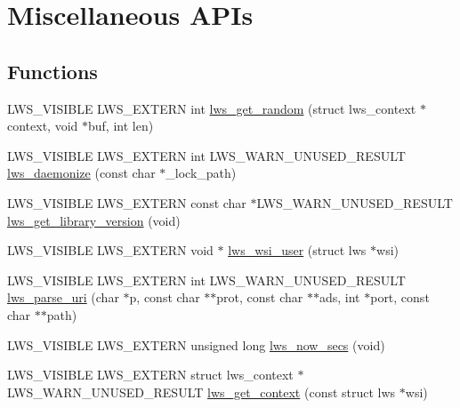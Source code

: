 \hypertarget{group__misc}{}\section{Miscellaneous A\+P\+Is}
\label{group__misc}
\subsection*{Functions}
\begin{DoxyCompactItemize}
\item 
L\+W\+S\+\_\+\+V\+I\+S\+I\+B\+LE L\+W\+S\+\_\+\+E\+X\+T\+E\+RN int \hyperlink{group__misc_ga58f906c6be0ca80efd813f694569dd4a}{lws\+\_\+get\+\_\+random} (struct lws\+\_\+context $\ast$context, void $\ast$buf, int len)
\item 
L\+W\+S\+\_\+\+V\+I\+S\+I\+B\+LE L\+W\+S\+\_\+\+E\+X\+T\+E\+RN int L\+W\+S\+\_\+\+W\+A\+R\+N\+\_\+\+U\+N\+U\+S\+E\+D\+\_\+\+R\+E\+S\+U\+LT \hyperlink{group__misc_gace5171b1dbbc03ec89a98f8afdb5c9af}{lws\+\_\+daemonize} (const char $\ast$\+\_\+lock\+\_\+path)
\item 
L\+W\+S\+\_\+\+V\+I\+S\+I\+B\+LE L\+W\+S\+\_\+\+E\+X\+T\+E\+RN const char $\ast$L\+W\+S\+\_\+\+W\+A\+R\+N\+\_\+\+U\+N\+U\+S\+E\+D\+\_\+\+R\+E\+S\+U\+LT \hyperlink{group__misc_gac6abfc0b2bd5b2f09281a4432bb2f5f0}{lws\+\_\+get\+\_\+library\+\_\+version} (void)
\item 
L\+W\+S\+\_\+\+V\+I\+S\+I\+B\+LE L\+W\+S\+\_\+\+E\+X\+T\+E\+RN void $\ast$ \hyperlink{group__misc_gaa194584fff9698f3b280658f770ccd0f}{lws\+\_\+wsi\+\_\+user} (struct lws $\ast$wsi)
\item 
L\+W\+S\+\_\+\+V\+I\+S\+I\+B\+LE L\+W\+S\+\_\+\+E\+X\+T\+E\+RN int L\+W\+S\+\_\+\+W\+A\+R\+N\+\_\+\+U\+N\+U\+S\+E\+D\+\_\+\+R\+E\+S\+U\+LT \hyperlink{group__misc_ga1ec0d9faac5d3a5824d765c287c043aa}{lws\+\_\+parse\+\_\+uri} (char $\ast$p, const char $\ast$$\ast$prot, const char $\ast$$\ast$ads, int $\ast$port, const char $\ast$$\ast$path)
\item 
L\+W\+S\+\_\+\+V\+I\+S\+I\+B\+LE L\+W\+S\+\_\+\+E\+X\+T\+E\+RN unsigned long \hyperlink{group__misc_ga33bf2635033710b25f931b57ed663e1e}{lws\+\_\+now\+\_\+secs} (void)
\item 
L\+W\+S\+\_\+\+V\+I\+S\+I\+B\+LE L\+W\+S\+\_\+\+E\+X\+T\+E\+RN struct lws\+\_\+context $\ast$L\+W\+S\+\_\+\+W\+A\+R\+N\+\_\+\+U\+N\+U\+S\+E\+D\+\_\+\+R\+E\+S\+U\+LT \hyperlink{group__misc_ga0af4f7d2dd375aeedcfa7eb0e1101c4b}{lws\+\_\+get\+\_\+context} (const struct lws $\ast$wsi)
\item 
$$
\end{DoxyCompactItemize}

